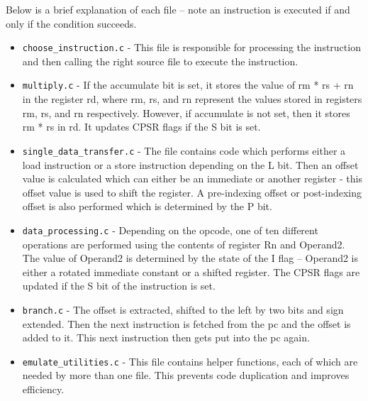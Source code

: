 \documentclass[11pt]{article}
\begin{document}
Below is a brief explanation of each file – note an instruction is executed if and only if the condition succeeds. 
\begin{itemize}
    \item \texttt{choose\_instruction.c} - This file is responsible for processing the instruction and then calling the right source file to execute the instruction. 
    \item \texttt{multiply.c} - If the accumulate bit is set, it stores the value of rm * rs + rn in the register rd, where rm, rs, and rn represent the values stored in registers rm, rs, and rn respectively. However, if accumulate is not set, then it stores rm * rs in rd. It updates CPSR flags if the S bit is set. 
    \item \texttt{single\_data\_transfer.c} - The file contains code which performs either a load instruction or a store instruction depending on the L bit. Then an offset value is calculated which can either be an immediate or another register - this offset value is used to shift the register. A pre-indexing offset or post-indexing offset is also performed which is determined by the P bit. 
    \item \texttt{data\_processing.c} - Depending on the opcode, one of ten different operations are performed using the contents of register Rn and Operand2. The value of Operand2 is determined by the state of the I flag – Operand2 is either a rotated immediate constant or a shifted register. The CPSR flags are updated if the S bit of the instruction is set. 
    \item \texttt{branch.c} - The offset is extracted, shifted to the left by two bits and sign extended. Then the next instruction is fetched from the pc and the offset is added to it. This next instruction then gets put into the pc again. 
    \item \texttt{emulate\_utilities.c} - This file contains helper functions, each of which are needed by more than one file. This prevents code duplication and improves efficiency.
    
\end{itemize}
\end{document}
